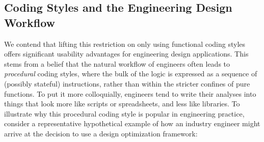 \subsection{Coding Styles and the Engineering Design Workflow}
\label{sec:code_style_workflow}

We contend that lifting this restriction on only using functional coding styles offers significant usability advantages for engineering design applications. This stems from a belief that the natural workflow of engineers often leads to \emph{procedural} coding styles, where the bulk of the logic is expressed as a sequence of (possibly stateful) instructions, rather than within the stricter confines of pure functions. To put it more colloquially, engineers tend to write their analyses into things that look more like scripts or spreadsheets, and less like libraries. To illustrate why this procedural coding style is popular in engineering practice, consider a representative hypothetical example of how an industry engineer might arrive at the decision to use a design optimization framework:

